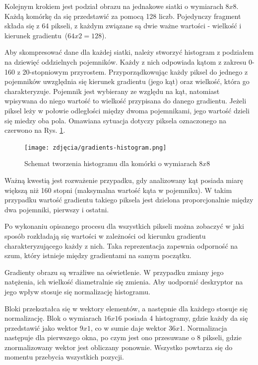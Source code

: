 Kolejnym krokiem jest podział obrazu na jednakowe siatki o wymiarach $8x8$. Każdą komórkę da się przedstawić za pomocą 128 liczb. Pojedynczy fragment składa się z 64 pikseli, z każdym związane są dwie ważne wartości - wielkość i kierunek gradientu~($64x2 = 128$). 

Aby skompresować dane dla każdej siatki, należy stworzyć histogram z podziałem na dziewięć oddzielnych pojemników. Każdy z nich odpowiada kątom z zakresu 0-160 z 20-stopniowym przyrostem. Przyporządkowując każdy piksel do jednego z pojemników uwzględnia się kierunek gradientu (jego kąt) oraz wielkość, która go charakteryzuje. Pojemnik jest wybierany ze względu na kąt, natomiast wpisywana do niego wartość to wielkość przypisana do danego gradientu. Jeżeli piksel leży w połowie odległości między dwoma pojemnikami, jego wartość dzieli się miedzy oba pola. Omawiana sytuacja dotyczy piksela oznaczonego na czerwono na Rys. \ref{fig:gradientHistogram}. 

\begin{figure}[h]
	\centering
	\texttt{[image: zdjęcia/gradients-histogram.png]}
	\caption{Schemat tworzenia histogramu dla komórki o wymiarach $8x8$ \cite{hog2}} 
	\label{fig:gradientHistogram}
\end{figure}

Ważną kwestią jest rozważenie przypadku, gdy analizowany kąt posiada miarę większą niż 160 stopni (maksymalna wartość kąta w pojemniku). W takim przypadku wartość gradientu takiego piksela jest dzielona proporcjonalnie między dwa pojemniki, pierwszy i ostatni.

Po wykonaniu opisanego procesu dla wszystkich pikseli można zobaczyć w jaki sposób rozkładają się wartości w zależności od kierunku gradientu charakteryzującego każdy z nich. Taka reprezentacja zapewnia odporność na szum, który istnieje między gradientami na samym początku.

Gradienty obrazu są wrażliwe na oświetlenie. W przypadku zmiany jego natężenia, ich wielkość diametralnie się zmienia. Aby uodpornić deskryptor na jego wpływ stosuje się normalizację histogramu. 

Bloki przekształca się w wektory elementów, a następnie dla każdego stosuje się normalizację. Blok o wymiarach $16x16$ posiada 4 histogramy, gdzie każdy da się przedstawić jako wektor $9x1$, co w sumie daje wektor $36x1$. Normalizacja następuje dla pierwszego okna, po czym jest ono przesuwane o 8 pikseli, gdzie znormalizowany wektor jest obliczany ponownie. Wszystko powtarza się do momentu przebycia wszystkich pozycji.

